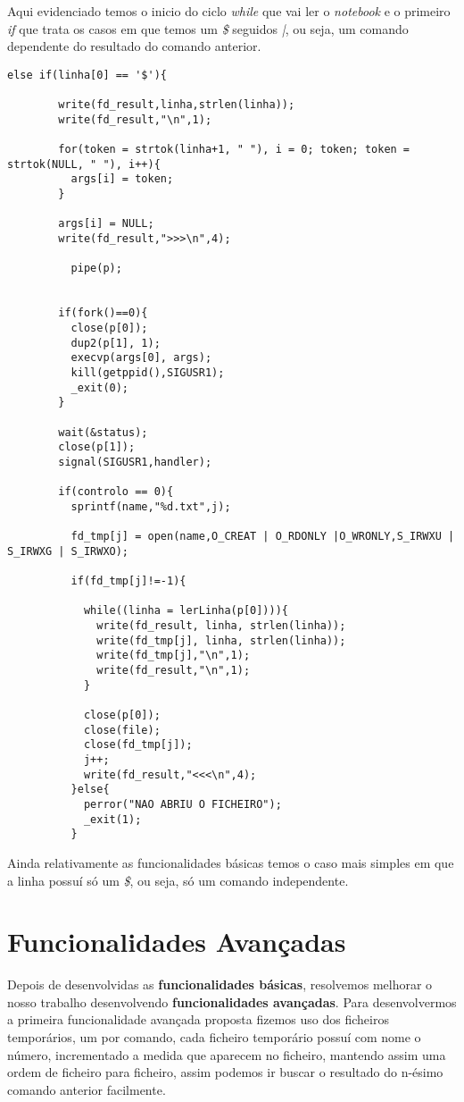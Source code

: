 \documentclass{report}
\begin{document}
  Aqui evidenciado temos o inicio do ciclo \textit{while} que vai ler o \textit{notebook} e o primeiro \textit{if} que trata os casos em que temos um \textit{\$} seguidos \textit{|}, ou seja, um comando dependente do resultado do comando anterior. 

\begin{verbatim}
else if(linha[0] == '$'){

        write(fd_result,linha,strlen(linha));
        write(fd_result,"\n",1);

        for(token = strtok(linha+1, " "), i = 0; token; token = strtok(NULL, " "), i++){
          args[i] = token;
        }
          
        args[i] = NULL;
        write(fd_result,">>>\n",4);

          pipe(p);


        if(fork()==0){
          close(p[0]);
          dup2(p[1], 1);
          execvp(args[0], args);
          kill(getppid(),SIGUSR1);
          _exit(0);
        }

        wait(&status);
        close(p[1]);
        signal(SIGUSR1,handler);

        if(controlo == 0){
          sprintf(name,"%d.txt",j);
        
          fd_tmp[j] = open(name,O_CREAT | O_RDONLY |O_WRONLY,S_IRWXU | S_IRWXG | S_IRWXO);

          if(fd_tmp[j]!=-1){

            while((linha = lerLinha(p[0]))){
              write(fd_result, linha, strlen(linha));
              write(fd_tmp[j], linha, strlen(linha));
              write(fd_tmp[j],"\n",1);
              write(fd_result,"\n",1);
            } 

            close(p[0]);
            close(file);
            close(fd_tmp[j]);
            j++;
            write(fd_result,"<<<\n",4);
          }else{
            perror("NAO ABRIU O FICHEIRO");
            _exit(1);
          }
\end{verbatim}

  Ainda relativamente as funcionalidades básicas temos o caso mais simples em que a linha possuí só um \textit{\$}, ou seja, só um comando independente.


\chapter{Funcionalidades Avançadas}

  Depois de desenvolvidas as \textbf{funcionalidades básicas}, resolvemos melhorar o nosso trabalho desenvolvendo \textbf{funcionalidades avançadas}.
  Para desenvolvermos a primeira funcionalidade avançada proposta fizemos uso dos ficheiros temporários, um por comando, cada ficheiro temporário possuí com nome o número, incrementado a medida que aparecem no ficheiro, mantendo assim uma ordem de ficheiro para ficheiro, assim podemos ir buscar o resultado do n-ésimo comando anterior facilmente.
\end{document}
